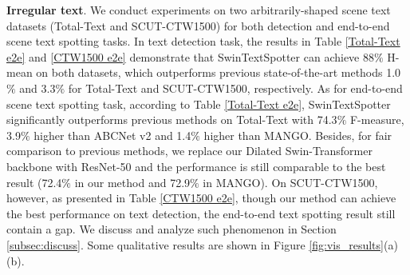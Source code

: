 \documentclass[10pt,twocolumn,letterpaper]{article}
\begin{document}
\begin{table*}[t!]
{\begin{tabular}{c|cccc|cc}
\end{tabular}}
\caption{Ablation studies on Total-Text without finetuning. ResNet-50 is used as the baseline backbone. TLSAM stands for the two-level self-attention mechanism. }
\label{Ablation}
\end{table*}


\textbf{Irregular text}. We conduct experiments on two arbitrarily-shaped scene text datasets (Total-Text and SCUT-CTW1500) for both detection and end-to-end scene text spotting tasks. In text detection task, the results in Table \ref{Total-Text e2e} and \ref{CTW1500 e2e} demonstrate that SwinTextSpotter can achieve 88$\%$ H-mean on both datasets, which outperforms previous state-of-the-art methods 1.0$\%$ and 3.3$\%$ for Total-Text and SCUT-CTW1500, respectively.
As for end-to-end scene text spotting task, according to Table \ref{Total-Text e2e}, SwinTextSpotter significantly outperforms previous methods on Total-Text with 74.3$\%$ F-measure, 3.9$\%$ higher than ABCNet v2 and 1.4$\%$ higher than MANGO. Besides, for fair comparison to previous methods, we replace our Dilated Swin-Transformer backbone with ResNet-50 and the performance is still comparable to the best result (72.4$\%$ in our method and 72.9$\%$ in MANGO). On SCUT-CTW1500, however, as presented in Table \ref{CTW1500 e2e}, though our method can achieve the best performance on text detection, the end-to-end text spotting result still contain a gap. We discuss and analyze such phenomenon in Section \ref{subsec:discuss}. Some qualitative results are shown in Figure \ref{fig:vis_results}(a)(b).

\begin{figure*}[h]
    \centering
    \caption{Visualization results of our method. White text represents the correct results; Red text represents the wrong results; Blue text represents that the GT of the text instance is marked as ``do not care". Best view in screen.}
    \label{fig:vis_results}
\end{figure*}
 
\end{document}
